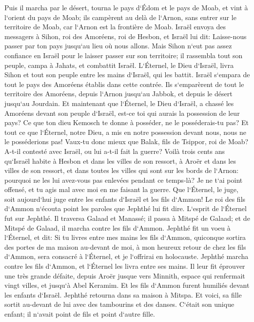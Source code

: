\verse Puis il marcha par le désert, tourna le pays d`Édom et le pays de Moab, et vint à l`orient du pays de Moab; ils campèrent au delà de l`Arnon, sans entrer sur le territoire de Moab, car l`Arnon est la frontière de Moab. 
\verse Israël envoya des messagers à Sihon, roi des Amoréens, roi de Hesbon, et Israël lui dit: Laisse-nous passer par ton pays jusqu`au lieu où nous allons. 
\verse Mais Sihon n`eut pas assez confiance en Israël pour le laisser passer sur son territoire; il rassembla tout son peuple, campa à Jahats, et combattit Israël. 
\verse L`Éternel, le Dieu d`Israël, livra Sihon et tout son peuple entre les mains d`Israël, qui les battit. Israël s`empara de tout le pays des Amoréens établis dans cette contrée. 
\verse Ils s`emparèrent de tout le territoire des Amoréens, depuis l`Arnon jusqu`au Jabbok, et depuis le désert jusqu`au Jourdain. 
\verse Et maintenant que l`Éternel, le Dieu d`Israël, a chassé les Amoréens devant son peuple d`Israël, est-ce toi qui aurais la possession de leur pays? 
\verse Ce que ton dieu Kemosch te donne à posséder, ne le posséderais-tu pas? Et tout ce que l`Éternel, notre Dieu, a mis en notre possession devant nous, nous ne le posséderions pas! 
\verse Vaux-tu donc mieux que Balak, fils de Tsippor, roi de Moab? A-t-il contesté avec Israël, ou lui a-t-il fait la guerre? 
\verse Voilà trois cents ans qu`Israël habite à Hesbon et dans les villes de son ressort, à Aroër et dans les villes de son ressort, et dans toutes les villes qui sont sur les bords de l`Arnon: pourquoi ne les lui avez-vous pas enlevées pendant ce temps-là? 
\verse Je ne t`ai point offensé, et tu agis mal avec moi en me faisant la guerre. Que l`Éternel, le juge, soit aujourd`hui juge entre les enfants d`Israël et les fils d`Ammon! 
\verse Le roi des fils d`Ammon n`écouta point les paroles que Jephthé lui fit dire. 
\verse L`esprit de l`Éternel fut sur Jephthé. Il traversa Galaad et Manassé; il passa à Mitspé de Galaad; et de Mitspé de Galaad, il marcha contre les fils d`Ammon. 
\verse Jephthé fit un voeu à l`Éternel, et dit: Si tu livres entre mes mains les fils d`Ammon, 
\verse quiconque sortira des portes de ma maison au-devant de moi, à mon heureux retour de chez les fils d`Ammon, sera consacré à l`Éternel, et je l`offrirai en holocauste. 
\verse Jephthé marcha contre les fils d`Ammon, et l`Éternel les livra entre ses mains. 
\verse Il leur fit éprouver une très grande défaite, depuis Aroër jusque vers Minnith, espace qui renfermait vingt villes, et jusqu`à Abel Keramim. Et les fils d`Ammon furent humiliés devant les enfants d`Israël. 
\verse Jephthé retourna dans sa maison à Mitspa. Et voici, sa fille sortit au-devant de lui avec des tambourins et des danses. C`était son unique enfant; il n`avait point de fils et point d`autre fille. 
